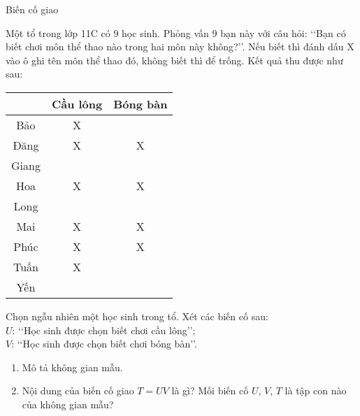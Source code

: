 \begin{dang}{Biến cố giao}
\end{dang}
\begin{vd}%
	Một tổ trong lớp 11C có $9$ học sinh. Phỏng vấn $9$ bạn này với câu hỏi: \lq\lq Bạn có biết chơi môn thể thao nào trong hai môn này không?\rq\rq. Nếu biết thì đánh dấu X vào ô ghi tên môn thể thao đó, không biết thì để trống. Kết quả thu được như sau:
	\begin{center}
	\begin{tabular}{|c|c|c|}
	\hline
	\diagbox{Tên học sinh}{Môn thể thao} & Cầu lông & Bóng bàn \\
	\hline
	Bảo & X & \\
	\hline
	Đăng & X & X \\
	\hline
	Giang & & \\
	\hline
	Hoa & X & X \\
	\hline
	Long & & \\
	\hline
	Mai & X & X \\
	\hline
	Phúc & X & X \\
	\hline
	Tuấn & X & \\
	\hline
	Yến & & \\
	\hline
	\end{tabular}
	\end{center}
	Chọn ngẫu nhiên một học sinh trong tổ. Xét các biến cố sau:\\	
	$U$: \lq\lq Học sinh được chọn biết chơi cầu lông\rq\rq;\\
	$V$: \lq\lq Học sinh được chọn biết chơi bóng bàn\rq\rq.
	\begin{enumerate}
	\item Mô tả không gian mẫu.
	\item Nội dung của biến cố giao $T=U V$ là gì? Mối biến cố $U$, $V$, $T$ là tập con nào của không gian mẫu?
	\end{enumerate}
\end{vd}
